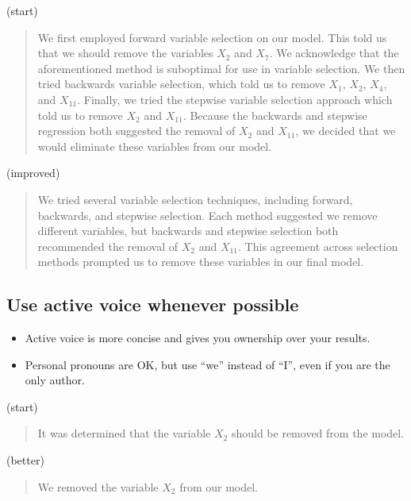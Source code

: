 \documentclass[12pt]{notes}
\begin{document}
(start)
\begin{quote}
We first employed forward variable selection on our model. This told us that we should remove the variables $X_2$ and $X_7$. We acknowledge that the aforementioned method is suboptimal for use in variable selection. We then tried backwards variable selection, which told us to remove $X_1$, $X_2$, $X_4$, and $X_{11}.$ Finally, we tried the stepwise variable selection approach which told us to remove $X_2$ and $X_{11}$. Because the backwards and stepwise regression both suggested the removal of $X_2$ and $X_{11}$, we decided that we would eliminate these variables from our model. 
\end{quote}

(improved)
\begin{quote}
We tried several variable selection techniques, including forward, backwards, and stepwise selection. Each method suggested we remove different variables, but backwards and stepwise selection both recommended the removal of $X_2$ and $X_{11}$. This agreement across selection methods prompted us to remove these variables in our final model. 
\end{quote}

\subsection*{Use active voice whenever possible}
\begin{itemize}
\item Active voice is more concise and gives you ownership over your results. 
\item Personal pronouns are OK, but use ``we'' instead of ``I'', even if you are the only author. 
\end{itemize}

(start)
\begin{quote}
It was determined that the variable $X_2$ should be removed from the model. 
\end{quote}

(better)
\begin{quote}
We removed the variable $X_2$ from our model. 
\end{quote}

\end{document}
